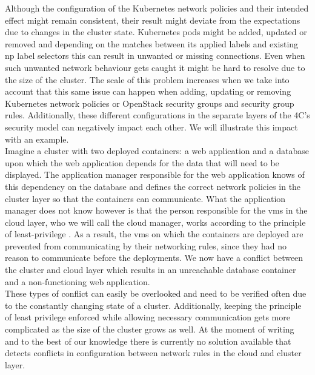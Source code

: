 Although the configuration of the Kubernetes network policies and their intended effect might remain consistent, their result might deviate from the expectations due to changes in the cluster state. Kubernetes pods might be added, updated or removed and depending on the matches between its applied labels and existing \acrshort{np} label selectors this can result in unwanted or missing connections. Even when such unwanted network behaviour gets caught it might be hard to resolve due to the size of the cluster. The scale of this problem increases when we take into account that this same issue can happen when adding, updating or removing Kubernetes network policies or OpenStack security groups and security group rules. Additionally, these different configurations in the separate layers of the 4C's security model can negatively impact each other. We will illustrate this impact with an example.
\\[10pt]

Imagine a cluster with two deployed containers: a web application and a database upon which the web application depends for the data that will need to be displayed. The application manager responsible for the web application knows of this dependency on the database and defines the correct network policies in the cluster layer so that the containers can communicate. What the application manager does not know however is that the person responsible for the \acrshort{vm}s in the cloud layer, who we will call the cloud manager, works according to the principle of least-privilege \cite{leastprivilige}. As a result, the \acrshort{vm}s on which the containers are deployed are prevented from communicating by their networking rules, since they had no reason to communicate before the deployments. We now have a conflict between the cluster and cloud layer which results in an unreachable database container and a non-functioning web application.
\\[10pt]

These types of conflict can easily be overlooked and need to be verified often due to the constantly changing state of a cluster. Additionally, keeping the principle of least privilege enforced while allowing necessary communication gets more complicated as the size of the cluster grows as well. At the moment of writing and to the best of our knowledge there is currently no solution available that detects conflicts in configuration between network rules in the cloud and cluster layer.
\\[10pt]


